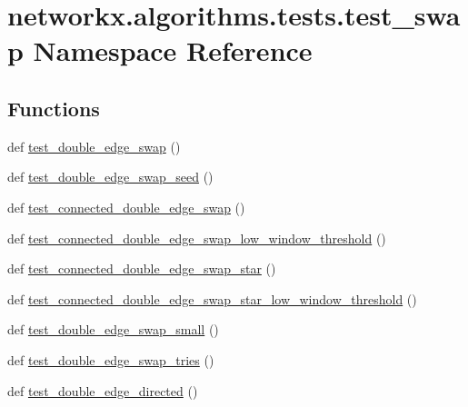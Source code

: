 \hypertarget{namespacenetworkx_1_1algorithms_1_1tests_1_1test__swap}{}\section{networkx.\+algorithms.\+tests.\+test\+\_\+swap Namespace Reference}
\label{namespacenetworkx_1_1algorithms_1_1tests_1_1test__swap}
\subsection*{Functions}
\begin{DoxyCompactItemize}
\item 
def \hyperlink{namespacenetworkx_1_1algorithms_1_1tests_1_1test__swap_af472bea156435b652d9df1acd78273c9}{test\+\_\+double\+\_\+edge\+\_\+swap} ()
\item 
def \hyperlink{namespacenetworkx_1_1algorithms_1_1tests_1_1test__swap_a08c017c74b0d663f8a2a314b6d90b926}{test\+\_\+double\+\_\+edge\+\_\+swap\+\_\+seed} ()
\item 
def \hyperlink{namespacenetworkx_1_1algorithms_1_1tests_1_1test__swap_a351294eb0a113624b71dd0b209b72acf}{test\+\_\+connected\+\_\+double\+\_\+edge\+\_\+swap} ()
\item 
def \hyperlink{namespacenetworkx_1_1algorithms_1_1tests_1_1test__swap_a14db8a1b073775ab3fa1ac12e7d65888}{test\+\_\+connected\+\_\+double\+\_\+edge\+\_\+swap\+\_\+low\+\_\+window\+\_\+threshold} ()
\item 
def \hyperlink{namespacenetworkx_1_1algorithms_1_1tests_1_1test__swap_a3101277e48bc34f3f658770942fc5e21}{test\+\_\+connected\+\_\+double\+\_\+edge\+\_\+swap\+\_\+star} ()
\item 
def \hyperlink{namespacenetworkx_1_1algorithms_1_1tests_1_1test__swap_a1049d981b92e9ba20f9a2343b3cae538}{test\+\_\+connected\+\_\+double\+\_\+edge\+\_\+swap\+\_\+star\+\_\+low\+\_\+window\+\_\+threshold} ()
\item 
def \hyperlink{namespacenetworkx_1_1algorithms_1_1tests_1_1test__swap_aac2571a01acb12289f38d8429e405da0}{test\+\_\+double\+\_\+edge\+\_\+swap\+\_\+small} ()
\item 
def \hyperlink{namespacenetworkx_1_1algorithms_1_1tests_1_1test__swap_a52e8a117a8e870baff962a2b15fb100d}{test\+\_\+double\+\_\+edge\+\_\+swap\+\_\+tries} ()
\item 
def \hyperlink{namespacenetworkx_1_1algorithms_1_1tests_1_1test__swap_a0f51e893c7fd498ca240b5be5b19d162}{test\+\_\+double\+\_\+edge\+\_\+directed} ()

\end{DoxyCompactItemize}
